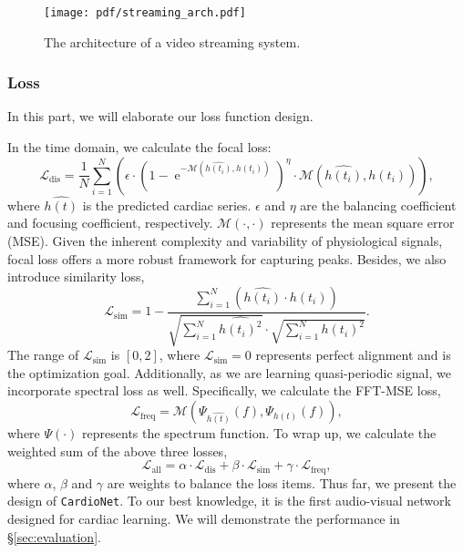 \begin{figure}[t]
    \centering
    \texttt{[image: pdf/streaming\_arch.pdf]}
    \caption{The architecture of a video streaming system.}
    \label{fig:streaming_arch}
\end{figure}
\subsubsection{Loss} 
In this part, we will elaborate our loss function design. 

In the time domain, we calculate the focal loss:
\begin{equation}
    \mathcal{L}_{\text{dis}} = \frac{1}{N}\sum_{i=1}^{N} \left(\epsilon \cdot \left(1-\operatorname{e}^{-\mathcal{M}\left(\hat{h(t_i)}, h(t_i)\right)}\right)^\eta \cdot \mathcal{M}\left(\hat{h(t_i)}, h(t_i)\right)\right),
\end{equation}
where $\hat{h(t)}$ is the predicted cardiac series. $\epsilon$ and $\eta$ are the balancing coefficient and focusing coefficient, respectively. $\mathcal{M}(\cdot, \cdot)$ represents the mean square error (MSE).
Given the inherent complexity and variability of physiological signals, focal loss offers a more robust framework for capturing peaks. Besides, we also introduce similarity loss,
\begin{equation}
    \mathcal{L}_{\text{sim}} = 1 -  \frac{\sum_{i=1}^N \left(\hat{h(t_i)}\cdot h(t_i)\right) }{\sqrt{\sum_{i=1}^N \hat{h(t_i)^2}}\cdot \sqrt{\sum_{i=1}^N h(t_i)^2}}.
\end{equation}
The range of $\mathcal{L}_{\text{sim}}$ is $[0,2]$, where $\mathcal{L}_{\text{sim}}=0$ represents perfect alignment and is the optimization goal. Additionally, as we are learning quasi-periodic signal, we incorporate spectral loss as well. Specifically, we calculate the FFT-MSE loss,
\begin{equation}
    \mathcal{L}_{\text{freq}} = \mathcal{M}\left(\Psi_{\hat{h(t)}}(f), \Psi_{h(t)}(f) \right),
\end{equation}
where $\Psi(\cdot)$ represents the spectrum function. To wrap up, we calculate the weighted sum of the above three losses,
\begin{equation}
    \mathcal{L}_{\text{all}} = \alpha \cdot \mathcal{L}_{\text{dis}} + \beta \cdot \mathcal{L}_{\text{sim}} + \gamma \cdot \mathcal{L}_{\text{freq}},
\end{equation}
where $\alpha$, $\beta$ and $\gamma$ are weights to balance the loss items. 
Thus far, we present the design of \texttt{CardioNet}. To our best knowledge, it is the first audio-visual network designed for cardiac learning. We will demonstrate the performance in \S\ref{sec:evaluation}. 

